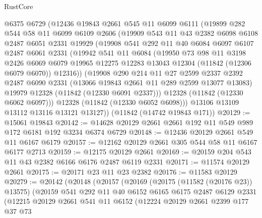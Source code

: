 \begin{lexlean}{RustCore}
\begin{coremodule}
    @6375
    @6729
    (@12436
      @19843
      @2661
      @545
      @11
      @6099
      @6111
      (@19899
        @282
        @544
        @58
        @11
        @6099
        @6109
        @2606
        (@19909
          @543
          @11
          @43
          @2382
          @6098
          @6108
          @2487
          @6051
          @2331
          @19929
          (@19908
            @541
            @292
            @11
            @40
            @6084
            @6097
            @6107
            @2487
            @6061
            @2331
            (@19942
              @541
              @11
              @6084
              (@19950
                @73
                @98
                @11
                @3198
                @2426
                @6069
                @6079
                @19965
                @12275
                @12283
                @13043
                @12304
                (@11842 (@12306 @6079 @6070))
                @12316))
            (@19908
              @290
              @214
              @11
              @27
              @2599
              @2337
              @2392
              @2487
              @6090
              @2331
              (@13066 @19843 @2661 @11 @289 @2599 @13077 @13083)
              @19979
              @12328
              (@11842 (@12330 @6091 @2337)))
            @12328
            (@11842 (@12330 @6062 @6097)))
          @12328
          (@11842 (@12330 @6052 @6098)))
        @13106
        @13109
        @13112
        @13116
        @13121
        @13127))
    (@11842 (@14742 @19843 @171))
@20129 := @15061 @19843
@20142 := @14628 @20129 @2661 @2661 @192 @11 @549 @989 @172 @6181 @192 @3234 @6374 @6729
@20148 := @12436 @20129 @2661 @549 @11 @6167 @6179
@20157 := @12162 @20129 @2661 @305 @544 @58 @11 @6167 @6177 @2713
@20159 := @12175 @20129 @2661
@20169 := @20159 @204 @543 @11 @43 @2382 @6166 @6176 @2487 @6119 @2331
@20171 := @11574 @20129 @2661
@20175 := @20171 @23 @11 @23 @2382
@20176 := @11583 @20129
@20279 := @20142
    (@20148
      (@20157
        (@20169
          (@20175 (@11582 (@20176 @23)) @13575)
          (@20159
            @541
            @292
            @11
            @40
            @6152
            @6165
            @6175
            @2487
            @6129
            @2331
            (@12215
              @20129
              @2661
              @541
              @11
              @6152
              (@12224
                @20129
                @2661
                @2399
                @177
                @37
                @73

\end{coremodule}
\end{lexlean}
